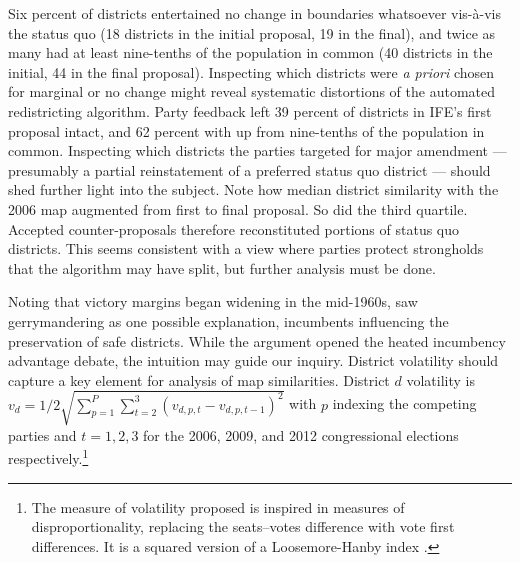 \documentclass[letter,12pt]{article}
\begin{document}
Six percent of districts entertained no change in boundaries whatsoever vis-\`a-vis the status quo (18 districts in the initial proposal, 19 in the final), and twice as many had at least nine-tenths of the population in common (40 districts in the initial, 44 in the final proposal). Inspecting which districts were \emph{a priori} chosen for marginal or no change might reveal systematic distortions of the automated redistricting algorithm. Party feedback left 39 percent of districts in IFE's first proposal intact, and 62 percent with up from nine-tenths of the population in common. Inspecting which districts the parties targeted for major amendment --- presumably a partial reinstatement of a preferred status quo district --- should shed further light into the subject. Note how median district similarity with the 2006 map augmented from first to final proposal. So did the third quartile. Accepted counter-proposals therefore reconstituted portions of status quo districts. This seems consistent with a view where parties protect strongholds that the algorithm may have split, but further analysis must be done. 




Noting that victory margins began widening in the mid-1960s, \citet{mayhew1974vanishingMg} saw gerrymandering as one possible explanation, incumbents influencing the preservation of safe districts. While the argument opened the heated incumbency advantage debate, the intuition may guide our inquiry. District volatility should capture a key element for analysis of map similarities. District $d$ volatility is $v_d = 1/2 \sqrt{ \sum_{p=1}^P \sum_{t=2}^3 (v_{d,p,t}- v_{d,p,t-1})^2 }$ with $p$ indexing the competing parties and $t=1,2,3$ for the 2006,  2009, and 2012 congressional elections respectively.\footnote{The measure of volatility proposed is inspired in measures of disproportionality, replacing the seats--votes difference with vote first differences. It is a squared version of a Loosemore-Hanby index \citep{loosemore.hanbyDisproportionality1971,gallagherDisproportionality1991}.} 
\end{document}
